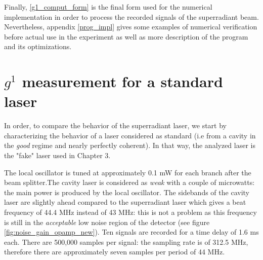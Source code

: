 \documentclass[11pt]{report}
\begin{document}
Finally, \eqref{g1_comput_form} is the final form used for the numerical implementation in order to process the recorded signals of the superradiant beam. Nevertheless, appendix \ref{prog_impl} gives some examples of numerical verification before actual use in the experiment as well as more description of the program and its optimizations.

\section{$g^1$ measurement for a standard laser}

In order, to compare the behavior of the superradiant laser, we start by characterizing the behavior of a laser considered as standard (i.e from a cavity in the \textit{good} regime and nearly perfectly coherent). In that way, the analyzed laser is the "fake" laser used in Chapter 3.

The local oscillator is tuned at approximately 0.1 mW for each branch after the beam splitter.The cavity laser is considered as \textit{weak} with a couple of microwatts: the main power is produced by the local oscillator. The sidebands of the cavity laser are slightly ahead compared to the superradiant laser which gives a beat frequency of 44.4 MHz instead of 43 MHz: this is not a problem as this frequency is still in the \textit{acceptable} low noise region of the detector (see figure \ref{fig:noise_gain_opamp_new}). Ten signals are recorded for a time delay of 1.6 ms each. There are 500,000 samples per signal: the sampling rate is of 312.5 MHz, therefore there are approximately seven samples per period of 44 MHz.
\end{document}
